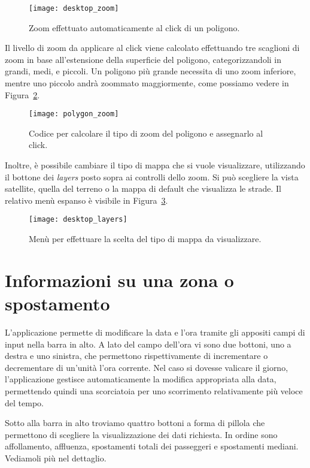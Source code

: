 \begin{figure}[H]
    \centering
    \texttt{[image: desktop\_zoom]}
    \caption[Zoom automatico al click di un poligono]{Zoom effettuato automaticamente al click di un poligono.}
    \label{fig:zoom_desktop}
\end{figure}

Il livello di zoom da applicare al click viene calcolato effettuando tre scaglioni di zoom in base all'estensione della superficie del poligono, categorizzandoli in grandi, medi, e piccoli. Un poligono più grande necessita di uno zoom inferiore, mentre uno piccolo andrà zoommato maggiormente, come possiamo vedere in Figura~\ref{fig:zoom_code}.

\begin{figure}[H]
    \centering
    \texttt{[image: polygon\_zoom]}
    \caption[Codice per lo zoom al click del poligono]{Codice per calcolare il tipo di zoom del poligono e assegnarlo al click.}
    \label{fig:zoom_code}
\end{figure}

Inoltre, è possibile cambiare il tipo di mappa che si vuole visualizzare, utilizzando il bottone dei \textit{layers} posto sopra ai controlli dello zoom. Si può scegliere la vista satellite, quella del terreno o la mappa di default che visualizza le strade. Il relativo menù espanso è visibile in Figura~\ref{fig:layers}.

\begin{figure}[H]
    \centering
    \texttt{[image: desktop\_layers]}
    \caption[Menù per la scelta del tipo di mappa]{Menù per effettuare la scelta del tipo di mappa da visualizzare.}
    \label{fig:layers}
\end{figure}

\section{Informazioni su una zona o spostamento}
L'applicazione permette di modificare la data e l'ora tramite gli appositi campi di input nella barra in alto. A lato del campo dell'ora vi sono due bottoni, uno a destra e uno sinistra, che permettono rispettivamente di incrementare o decrementare di un'unità l'ora corrente. Nel caso si dovesse valicare il giorno, l'applicazione gestisce automaticamente la modifica appropriata alla data, permettendo quindi una scorciatoia per uno scorrimento relativamente più veloce del tempo.

Sotto alla barra in alto troviamo quattro bottoni a forma di pillola che permettono di scegliere la visualizzazione dei dati richiesta. In ordine sono affollamento, affluenza, spostamenti totali dei passeggeri e spostamenti mediani. Vediamoli più nel dettaglio.


